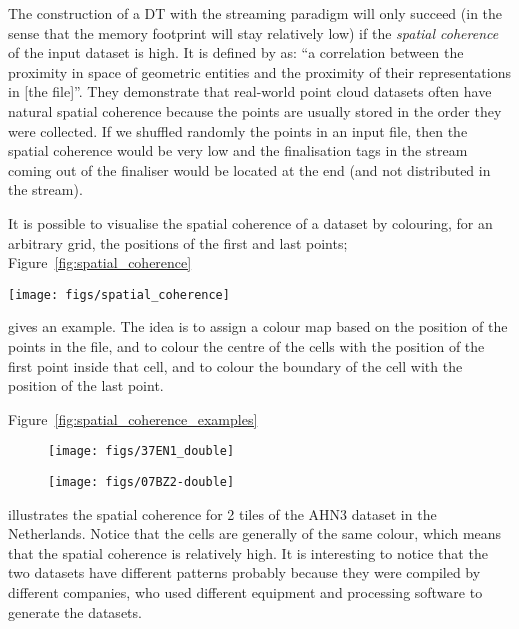 The construction of a DT with the streaming paradigm will only succeed (in the sense that the memory footprint will stay relatively low) if the \emph{spatial coherence}%
of the input dataset is high.
It is defined by \citeauthor{Isenburg06} as:
``a correlation between the proximity in space of geometric entities and the proximity of their representations in [the file]''.
They demonstrate that real-world point cloud datasets often have natural spatial coherence because the points are usually stored in the order they were collected.
If we shuffled randomly the points in an input file, then the spatial coherence would be very low and the finalisation tags in the stream coming out of the finaliser would be located at the end (and not distributed in the stream).

%

It is possible to visualise the spatial coherence of a dataset by colouring, for an arbitrary grid, the positions of the first and last points; Figure~\ref{fig:spatial_coherence}
\begin{marginfigure}
  \centering
  \texttt{[image: figs/spatial\_coherence]}
  \caption{The colour map used for the position of a point in the file, and 3 examples of cells.}%
\label{fig:spatial_coherence}
\end{marginfigure}
gives an example.
The idea is to assign a colour map based on the position of the points in the file, and to colour the centre of the cells with the position of the first point inside that cell, and to colour the boundary of the cell with the position of the last point.

Figure~\ref{fig:spatial_coherence_examples}
\begin{figure*}
  \centering
  \begin{subfigure}[b]{0.45\linewidth}
    \centering
    \texttt{[image: figs/37EN1\_double]}
    \caption{}
  \end{subfigure}%
  \qquad
  \begin{subfigure}[b]{0.45\linewidth}
    \centering
    \texttt{[image: figs/07BZ2-double]}
    \caption{}
  \end{subfigure}
\caption{Spatial coherence of 2 AHN3 tiles. The inner cell colour indicates the position in the stream of first point in that cell, and the outer cell colour indicates the position in the stream of the last point in that cell.}%
\label{fig:spatial_coherence_examples}
\end{figure*}
illustrates the spatial coherence for 2 tiles of the AHN3 dataset in the Netherlands.
Notice that the cells are generally of the same colour, which means that the spatial coherence is relatively high.
It is interesting to notice that the two datasets have different patterns probably because they were compiled by different companies, who used different equipment and processing software to generate the datasets.


